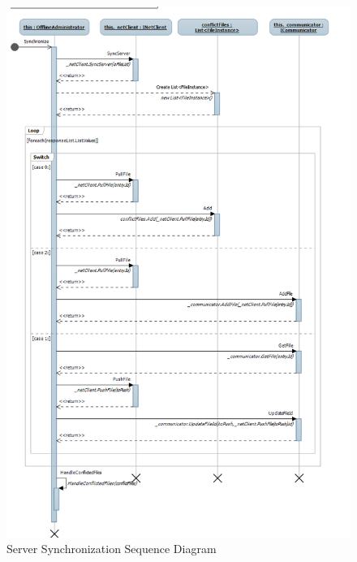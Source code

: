 \begin{figure}[H]
  \includegraphics[width=\textwidth]{illustrations/ClientSynchfulldiagram.png}
  \caption{Server Synchronization Sequence Diagram}
  \label{serversyncsequencediagram}
\end{figure}

